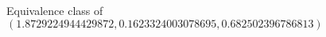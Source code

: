 \documentclass[preview]{standalone}
\begin{document}
\begin{center}
Equivalence class of $(1.8729224944429872, 0.1623324003078695, 0.682502396786813)$
\end{center}
\end{document}
